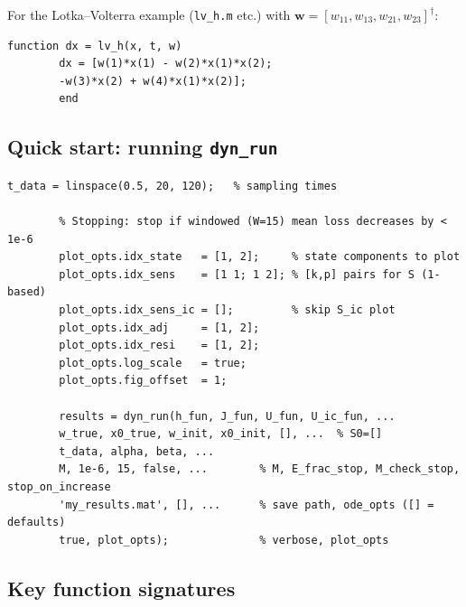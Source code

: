 \documentclass[10pt]{article}
\begin{document}
	For the Lotka--Volterra example (\texttt{lv\_h.m} etc.)
	with $\mathbf{w}=[w_{11},w_{13},w_{21},w_{23}]^\dagger$:
	\begin{lstlisting}[style=matlab]
		function dx = lv_h(x, t, w)
		dx = [w(1)*x(1) - w(2)*x(1)*x(2);
		-w(3)*x(2) + w(4)*x(1)*x(2)];
		end
	\end{lstlisting}
	
	\pagebreak
	
	\subsection{Quick start: running \texttt{dyn\_run}}
	
	\vspace{6pt}
	
	\begin{lstlisting}[style=matlab]
		t_data = linspace(0.5, 20, 120);   % sampling times
		
		% Stopping: stop if windowed (W=15) mean loss decreases by < 1e-6
		plot_opts.idx_state   = [1, 2];     % state components to plot
		plot_opts.idx_sens    = [1 1; 1 2]; % [k,p] pairs for S (1-based)
		plot_opts.idx_sens_ic = [];         % skip S_ic plot
		plot_opts.idx_adj     = [1, 2];
		plot_opts.idx_resi    = [1, 2];
		plot_opts.log_scale   = true;
		plot_opts.fig_offset  = 1;
		
		results = dyn_run(h_fun, J_fun, U_fun, U_ic_fun, ...
		w_true, x0_true, w_init, x0_init, [], ...  % S0=[]
		t_data, alpha, beta, ...
		M, 1e-6, 15, false, ...        % M, E_frac_stop, M_check_stop, stop_on_increase
		'my_results.mat', [], ...      % save path, ode_opts ([] = defaults)
		true, plot_opts);              % verbose, plot_opts
	\end{lstlisting}
	
	\subsection{Key function signatures}
	
\end{document}

